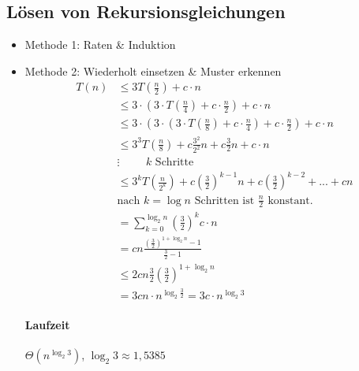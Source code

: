 \subsection{Lösen von Rekursionsgleichungen}
\begin{itemize}
\item   Methode 1: Raten \& Induktion
\item   Methode 2: Wiederholt einsetzen \& Muster erkennen
        \begin{align*}
         T(n)   &\leq 3 T\left(\frac{n}{2}\right) + c \cdot n \\
                &\leq 3 \cdot \left(3 \cdot T\left(\frac{n}{4}\right) + c \cdot \frac{n}{2}\right) + c \cdot n \\
                &\leq 3 \cdot \left(3 \cdot  \left(3 \cdot T\left(\frac{n}{8}\right) + c \cdot \frac{n}{4}\right) + c \cdot \frac{n}{2}\right) + c \cdot n\\
                &\leq 3^3 T\left(\frac{n}{8}\right) + c \frac{3^2}{2^2}n + c \frac{3}{2}n + c \cdot n\\
                &\vdots \hspace{1cm}\text{$k$ Schritte}\\
                &\leq 3^k T\left(\frac{n}{2^k}\right) + c \left(\frac{3}{2}\right)^{k-1}n + c\left(\frac{3}{2}\right)^{k-2} + ... + cn\\
                & \text{nach $k = \log n$ Schritten ist $\frac{n}{2}$ konstant.}\\
                &= \sum\limits_{k = 0}^{\log_2 n} \left(\frac{3}{2}\right)^k c \cdot n\\
                &= cn \frac{\left(\frac{3}{2}\right)^{1 + \log_2 n} - 1}{\frac{3}{2} - 1} \tag{geometrische Reihe}\\
                &\leq 2 cn \frac{3}{2} \left(\frac{3}{2}\right)^{1 + \log_2 n}\\
                &= 3 cn \cdot n^{\log_2 \frac{3}{2}} = 3 c \cdot n^{\log_2 3}
        \end{align*}
        \paragraph*{Laufzeit} $\Theta(n^{\log_2 3})$, $\log_2 3 \approx 1{,}5385$
\end{itemize}


